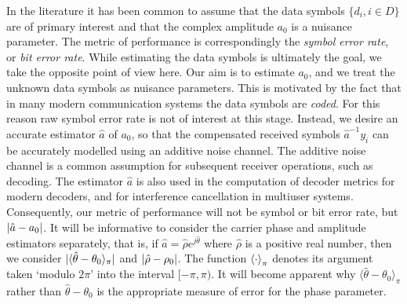\documentclass[journal]{IEEEtran}
\begin{document}
In the literature it has been common to assume that the data symbols $\{d_i, i \in D\}$ are of primary interest and that the complex amplitude $a_0$ is a nuisance parameter.  The metric of performance is correspondingly the \emph{symbol error rate}, or \emph{bit error rate}.  While estimating the data symbols is ultimately the goal, we take the opposite point of view here.  Our aim is to estimate $a_0$, and we treat the unknown data symbols as nuisance parameters.  This is motivated by the fact that in many modern communication systems the data symbols are \emph{coded}.  For this reason raw symbol error rate is not of interest at this stage.  Instead, we desire an accurate estimator $\hat{a}$ of $a_0$, so that the compensated received symbols $\hat{a}^{-1}y_i$ can be accurately modelled using an additive noise channel.  The additive noise channel is a common assumption for subsequent receiver operations, such as decoding.  The estimator $\hat{a}$ is also used in the computation of decoder metrics for modern decoders, and for interference cancellation in multiuser systems.  Consequently, our metric of performance will not be symbol or bit error rate, but ${\vert \hat{a} - a_0 \vert}$. It will be informative to consider the carrier phase and amplitude estimators separately, that is, if $\hat{a} = \hat{\rho}e^{j\hat{\theta}}$ where $\hat{\rho}$ is a positive real number, then we consider ${\vert \langle\hat{\theta} - \theta_0\rangle_\pi \vert}$ and ${\vert \hat{\rho} - \rho_0 \vert}$.  The function $\left\langle \cdot \right\rangle_\pi$ denotes its argument taken `modulo $2\pi$' into the interval $[-\pi, \pi)$.  It will become apparent why $\langle\hat{\theta} - \theta_0\rangle_\pi$ rather than $\hat{\theta} - \theta_0$ is the appropriate measure of error for the phase parameter.

\end{document}
